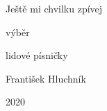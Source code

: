 \vspace*{5cm}
\begin{center}
\begin{Huge}
	\selectfont
	Ještě mi chvilku zpívej
\end{Huge}

\begin{large}
	výběr
	
	lidové písničky
\end{large}
\vspace{1cm}

\begin{Large}
František Hluchník
\vspace{4mm}

2020
\end{Large}
\end{center}
\newpage